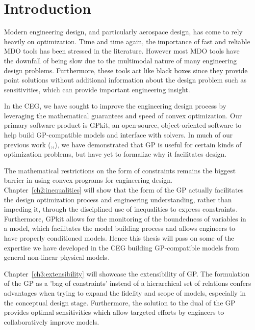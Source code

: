 \chapter{Introduction}
\label{ch1_intro}

Modern engineering design, and particularly aerospace design, has come to rely
heavily on optimization. Time and time again, the importance of fast and
reliable \gls{MDO} tools has been stressed in the literature. %
However most \gls{MDO} tools
have the downfall of being slow due to the multimodal nature of many
engineering design problems. Furthermore, these tools act like black boxes since
they provide point solutions without additional information about the design problem
such as sensitivities, which can provide important engineering insight.
%

In the \gls{CEG}, we have sought to improve the engineering design process by
leveraging the mathematical guarantees and speed of convex optimization.
Our primary software product is GPkit, an
open-source, object-oriented software to help build \gls{GP}-compatible models and
interface with solvers. In much of our previous work
(\cite{gp_ac_design},\cite{sp_ac_design},\cite{sp_engine}), we have demonstrated that
\gls{GP} is useful for certain kinds of optimization problems, but have yet to formalize why it
facilitates design.

The mathematical restrictions on the form of constraints remains the biggest
barrier in using convex programs for engineering design. Chapter~\ref{ch2:inequalities} will
show that the form of the \gls{GP} actually facilitates the design
optimization process
and engineering understanding, rather than impeding it, through the disciplined use
of inequalities to express constraints. Furthermore, GPkit allows for the
monitoring of the boundedness of variables in a model, which facilitates the model
building process and allows engineers
to have properly conditioned models. Hence this thesis will
pass on some of the expertise we have developed in the \gls{CEG} building
\gls{GP}-compatible models from general non-linear physical models.

Chapter~\ref{ch3:extensibility} will showcase the extensibility of \gls{GP}.
The formulation of the \gls{GP} as a 'bag of
constraints' instead of a hierarchical set of relations confers advantages
when trying to expand the fidelity and scope of models, especially in the
conceptual design stage. Furthermore, the solution to the dual of the \gls{GP}
provides optimal sensitivities which allow targeted efforts by engineers to
collaboratively improve models.

